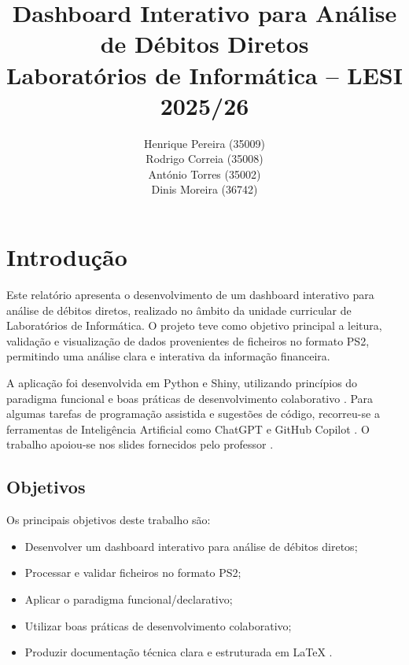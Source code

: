 \documentclass[11pt,a4paper]{report}
\title{
\textbf{Dashboard Interativo para Análise de Débitos Diretos}\\
\large Laboratórios de Informática -- LESI 2025/26
}
\author{
Henrique Pereira (35009)\\
Rodrigo Correia (35008)\\
António Torres (35002)\\
Dinis Moreira (36742)
}
\date{}
\begin{document}
\maketitle
\setcounter{page}{2}

\begingroup
\let\clearpage\relax  %
\tableofcontents
\listoffigures
\listoftables
\lstlistoflistings
\endgroup  %

\chapter{Introdução}
Este relatório apresenta o desenvolvimento de um dashboard interativo para análise de débitos diretos, realizado no âmbito da unidade curricular de Laboratórios de Informática. O projeto teve como objetivo principal a leitura, validação e visualização de dados provenientes de ficheiros no formato PS2, permitindo uma análise clara e interativa da informação financeira.

A aplicação foi desenvolvida em Python e Shiny, utilizando princípios do paradigma funcional e boas práticas de desenvolvimento colaborativo \cite{python,shiny}. Para algumas tarefas de programação assistida e sugestões de código, recorreu-se a ferramentas de Inteligência Artificial como ChatGPT e GitHub Copilot \cite{chatgpt,copilot}. O trabalho apoiou-se nos slides fornecidos pelo professor \cite{slides}.

\section{Objetivos}
Os principais objetivos deste trabalho são:
\begin{itemize}
    \item Desenvolver um dashboard interativo para análise de débitos diretos;
    \item Processar e validar ficheiros no formato PS2;
    \item Aplicar o paradigma funcional/declarativo;
    \item Utilizar boas práticas de desenvolvimento colaborativo;
    \item Produzir documentação técnica clara e estruturada em LaTeX \cite{lamport1994latex}.
\end{itemize}
\end{document}
